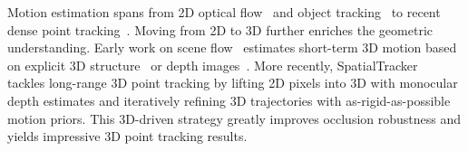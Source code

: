 

 Motion estimation spans from 2D optical flow~\cite{horn1981determining} and object tracking~\cite{wu2013online} to recent dense point tracking~\cite{harley2022particle}.
Moving from 2D to 3D further enriches the geometric understanding. Early work on scene flow~\cite{vedula1999three} estimates short-term 3D motion based on explicit 3D structure~\cite{menze2015object} or depth images~\cite{teed2021raft}. 
More recently, SpatialTracker~\cite{xiaoSpatialTrackerTrackingAny2024} tackles long-range 3D point tracking by lifting 2D pixels into 3D with monocular depth estimates and iteratively refining 3D trajectories with as-rigid-as-possible motion priors. 
This 3D-driven strategy greatly improves occlusion robustness and yields impressive 3D point tracking results.


